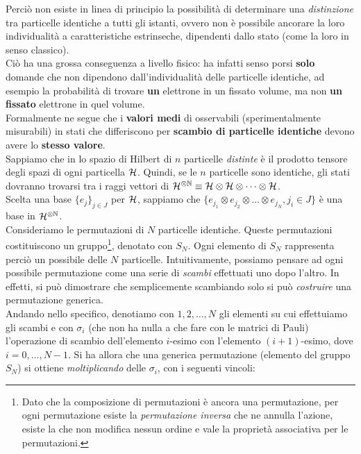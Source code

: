 \documentclass[../../FisicaTeorica.tex]{subfiles}
\begin{document}
Perciò non esiste in linea di principio la possibilità di determinare una \textit{distinzione} tra particelle identiche a tutti gli istanti, ovvero non è possibile ancorare la loro individualità a caratteristiche estrinseche, dipendenti dallo stato (come la loro  in senso classico).\\
Ciò ha una grossa conseguenza a livello fisico: ha infatti senso porsi \textbf{solo} domande che non dipendono dall'individualità delle particelle identiche, ad esempio la probabilità di trovare \textbf{un} elettrone in un fissato volume, ma non \textbf{un fissato} elettrone in quel volume.\\
Formalmente ne segue che i \textbf{valori medi} di osservabili (sperimentalmente misurabili) in stati che differiscono per \textbf{scambio di particelle identiche} devono avere lo \textbf{stesso valore}.\\
Sappiamo che in \MQ lo spazio di Hilbert di $n$ particelle \textit{distinte} è il prodotto tensore degli spazi di ogni particella $\mathcal{H}$. Quindi, se le $n$ particelle sono identiche, gli stati dovranno trovarsi tra i raggi vettori di $\mathcal{H}^{\otimes \mathbb{N}} \equiv \mathcal{H} \otimes \mathcal{H} \otimes \dots \otimes \mathcal{H}$.\\
Scelta una base $\{e_j\}_{j\in J}$ per $\mathcal{H}$, sappiamo che $\{e_{j_1}\otimes e_{j_2} \otimes \dots \otimes e_{j_N}, j_i \in J\}$ è una base in $\mathcal{H}^{\otimes \mathbb{N}}$.\\
Consideriamo le permutazioni di $N$ particelle identiche. Queste permutazioni costituiscono un gruppo\footnote{Dato che la composizione di permutazioni è ancora una permutazione, per ogni permutazione esiste la \textit{permutazione inversa} che ne annulla l'azione, esiste la  che non modifica nessun ordine e vale la proprietà associativa per le permutazioni.}, denotato con $S_N$. Ogni elemento di $S_N$ rappresenta perciò un possibile  delle $N$ particelle. Intuitivamente, possiamo pensare ad ogni possibile permutazione come una serie di \textit{scambi} effettuati uno dopo l'altro. In effetti, si può dimostrare che semplicemente scambiando solo  si può \textit{costruire} una permutazione generica.\\
Andando nello specifico, denotiamo con $1,2,\dots,N$ gli elementi su cui effettuiamo gli scambi e con $\sigma_i$ (che non ha nulla a che fare con le matrici di Pauli) l'operazione di scambio dell'elemento $i$-esimo con l'elemento $(i+1)$-esimo, dove $i = 0,\dots,N-1$. Si ha allora che una generica permutazione (elemento del gruppo $S_N$) si ottiene \textit{moltiplicando} delle $\sigma_i$, con i seguenti vincoli:
\end{document}
